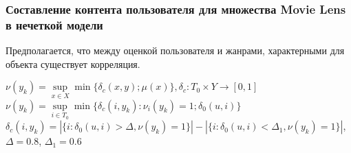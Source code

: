 \documentclass[10pt,xcolor={usenames,dvipsnames}]{beamer}
\theoremstyle{break}
\begin{document}
\begin{frame}
  \frametitle{Составление контента пользователя для множества Movie Lens в нечеткой модели}
  \begin{block}{}
    Предполагается, что между оценкой пользователя и жанрами, характерными для объекта существует корреляция.
  \end{block}


  \begin{block}{$\nu(y_k) = \underset{x \in X} {\mathrm{\sup}} \min\{ \delta_c(x,y); \mu(x) \}, \delta_c : T_0 \times Y \rightarrow [0,1]$} 
    $\nu(y_k) = \underset{i \in T_0} {\mathrm{\sup}} \min\{ \delta_c(i,y_k) : \nu_i(y_k) = 1; \delta_0(u, i) \}$ \\

    $\delta_c(i, y_k) = |\{ i : \delta_0(u, i) > \Delta, \nu(y_k) = 1\}| - |\{ i : \delta_0(u, i) < \Delta_1, \nu(y_k) = 1 \}|$,
    $\Delta = 0.8$, $\Delta_1 = 0.6$
  \end{block}
\end{frame}
\end{document}
